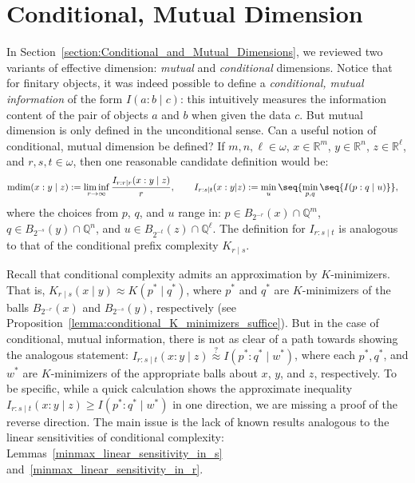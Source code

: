 \section{Conditional, Mutual Dimension}

In Section~\ref{section:Conditional_and_Mutual_Dimensions}, we reviewed two variants of effective dimension: \textit{mutual} and \textit{conditional} dimensions. Notice that for finitary objects, it was indeed possible to define a \textit{conditional, mutual information} of the form $I(a : b \mid c)$: this intuitively measures the information content of the pair of objects $a$ and $b$ when given the data $c$. But mutual dimension is only defined in the unconditional sense. Can a useful notion of conditional, mutual dimension be defined? If $m, n, \ell \in \omega$, $x \in \mathbb{R}^m$, $y \in \mathbb{R}^n$, $z \in \mathbb{R}^\ell$, and $r, s, t \in \omega$, then one reasonable candidate definition would be:
\begin{align*}
    \operatorname{mdim}(x : y \mid z) &:= \liminf_{r \to \infty} \frac{I_{r : r \mid r}(x : y \mid z)}{r}, \quad \quad I_{r : s \mid t}(x : y | z) := \min_u \seq{\min_{p, q} \seq{I(p : q \mid u)}},
\end{align*}
where the choices from $p$, $q$, and $u$ range in: $p \in B_{2^{-r}}(x) \cap \mathbb{Q}^m$, $q \in B_{2^{-s}}(y) \cap \mathbb{Q}^n$, and $u \in B_{2^{-t}}(z) \cap \mathbb{Q}^\ell$. The definition for $I_{r : s \mid t}$ is analogous to that of the conditional prefix complexity $K_{r \mid s}$. 

Recall that conditional complexity admits an approximation by $K$-minimizers. That is, $K_{r \mid s}(x \mid y) \approx K(p^* \mid q^*)$, where $p^*$ and $q^*$ are $K$-minimizers of the balls $B_{2^{-r}}(x)$ and $B_{2^{-s}}(y)$, respectively (see Proposition~\ref{lemma:conditional_K_minimizers_suffice}). But in the case of conditional, mutual information, there is not as clear of a path towards showing the analogous statement: $I_{r : s \mid t}(x : y \mid z) \stackrel{?}{\approx} I(p^* : q^* \mid w^*)$, where each $p^*, q^*$, and $w^*$ are $K$-minimizers of the appropriate balls about $x$, $y$, and $z$, respectively. To be specific, while a quick calculation shows the approximate inequality $I_{r : s \mid t}(x : y \mid z) \geq I(p^* : q^* \mid w^*)$ in one direction, we are missing a proof of the reverse direction. The main issue is the lack of known results analogous to the linear sensitivities of conditional complexity: Lemmas~\ref{minmax_linear_sensitivity_in_s} and~\ref{minmax_linear_sensitivity_in_r}.

